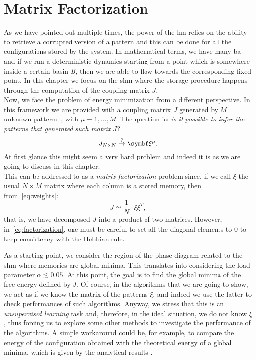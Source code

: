 \documentclass[\rootdir/main.tex]{subfiles}
\begin{document}
\chapter{Matrix Factorization}\label{chap:fact}
As we have pointed out multiple times, the power of the \acrlong{hm} relies on the ability to retrieve a corrupted version of a pattern and this can be done for all the configurations stored by the system. In mathematical terms, we have many \acrlong{ba} and if we run a deterministic dynamics starting from a point which is somewhere inside a certain basin $B$, then we are able to flow towards the corresponding fixed point. In this chapter we focus on the \acrlong{shm} where the storage procedure happens through the computation of the coupling matrix $J$.\\
Now, we face the problem of energy minimization from a different perspective. In this framework we are provided with a coupling matrix $J$ generated by $M$ unknown patterns \bxi, with $\mu = 1, \dots, M$. The question is:
\emph{is it possible to infer the patterns that generated such matrix $J$}?
\begin{equation*}
    J_{N \times N} \overset{?}{\rightarrow} \bxi.
\end{equation*}
At first glance this might seem a very hard problem and indeed it is as we are going to discuss in this chapter.\\
This can be addressed to as a \emph{matrix factorization} problem since, if we call $\xi$ the usual $N \times M$ matrix where each column is a stored memory, then from~\cref{eq:weights}:
\begin{equation}\label{eq:factorization}
    J \simeq \frac{1}{N} \cdot \xi \xi^T,
\end{equation}
that is, we have decomposed $J$ into a product of two matrices. However, in~\cref{eq:factorization}, one must be careful to set all the diagonal elements to $0$ to keep consistency with the Hebbian rule.

As a starting point, we consider the region of the phase diagram related to the \acrlong{shm} where memories are global minima. This translates into considering the load parameter $\alpha \lesssim 0.05$. At this point, the goal is to find the global minima of the free energy defined by $J$. Of course, in the algorithms that we are going to show, we act as if we know the matrix of the patterns $\xi$, and indeed we use the latter to check performances of such algorithms. Anyway, we stress that this is an \emph{unsupervised learning} task and, therefore, in the ideal situation, we do not know $\xi$, thus forcing us to explore some other methods to investigate the performance of the algorithms. A simple workaround could be, for example, to compare the energy of the configuration obtained with the theoretical energy of a global minima, which is given by the analytical results \parencite[see][for details]{amit2}.
\end{document}
